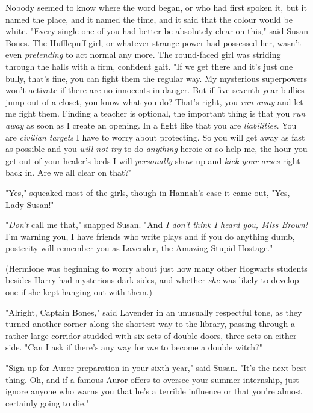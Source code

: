 Nobody seemed to know where the word began, or who had first spoken it, but it
named the place, and it named the time, and it said that the colour would be
white.
\later
"Every single one of you had better be absolutely clear on this," said Susan
Bones. The Hufflepuff girl, or whatever strange power had possessed her, wasn't
even \emph{pretending} to act normal any more. The round-faced girl was striding
through the halls with a firm, confident gait. "If we get there and it's just
one bully, that's fine, you can fight them the regular way. My mysterious
superpowers won't activate if there are no innocents in danger. But if five
seventh-year bullies jump out of a closet, you know what you do? That's right,
you \emph{run away} and let me fight them. Finding a teacher is optional, the
important thing is that you \emph{run away} as soon as I create an opening. In
a fight like that you are \emph{liabilities}. You are \emph{civilian targets} I
have to worry about protecting. So you will get away as fast as possible and
you \emph{will not try} to do \emph{anything} heroic or so help me, the hour
you get out of your healer's beds I will \emph{personally} show up and
\emph{kick your arses} right back in. Are we all clear on that?"

"Yes," squeaked most of the girls, though in Hannah's case it came out, "Yes,
Lady Susan!"

"\emph{Don't} call me that," snapped Susan. "And \emph{I don't think I heard
you, Miss Brown!} I'm warning you, I have friends who write plays and if you do
anything dumb, posterity will remember you as Lavender, the Amazing Stupid
Hostage."

(Hermione was beginning to worry about just how many other Hogwarts students
besides Harry had mysterious dark sides, and whether \emph{she} was likely to
develop one if she kept hanging out with them.)

"Alright, Captain Bones," said Lavender in an unusually respectful tone, as
they turned another corner along the shortest way to the library, passing
through a rather large corridor studded with six sets of double doors, three
sets on either side. "Can I ask if there's any way for \emph{me} to become a
double witch?"

"Sign up for Auror preparation in your sixth year," said Susan.
"It's the next best thing. Oh, and if a famous Auror offers to oversee your
summer internship, just ignore anyone who warns you that he's a terrible
influence or that you're almost certainly going to die."

